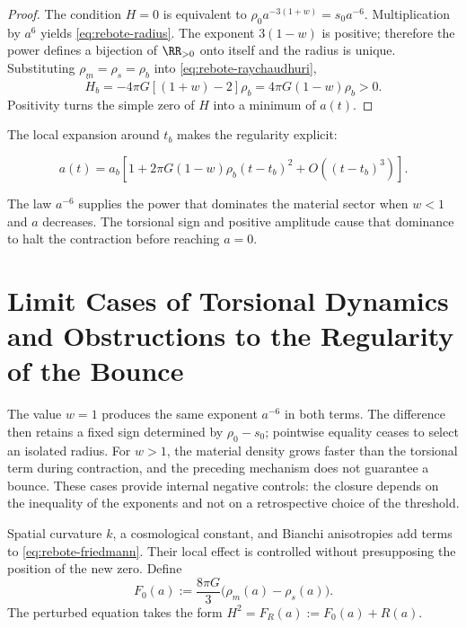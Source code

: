 \begin{proof}
The condition \(H=0\) is equivalent to
\(\rho_0a^{-3(1+w)}=s_0a^{-6}\).  Multiplication by \(a^6\) yields
\cref{eq:rebote-radius}.  The exponent \(3(1-w)\) is positive; therefore the
power defines a bijection of \(\RR_{>0}\) onto itself and the radius is
unique.  Substituting \(\rho_m=\rho_s=\rho_b\) into
\cref{eq:rebote-raychaudhuri},
\[
 \dot H_b=-4\pi G[(1+w)-2]\rho_b
 =4\pi G(1-w)\rho_b>0.
\]
Positivity turns the simple zero of \(H\) into a minimum of \(a(t)\).
\end{proof}

The local expansion around \(t_b\) makes the regularity explicit:

\begin{equation}
 a(t)=a_b\left[
 1+2\pi G(1-w)\rho_b(t-t_b)^2
 +O\!\left((t-t_b)^3\right)
 \right].
 \label{eq:rebote-local-expansion}
\end{equation}

The law \(a^{-6}\) supplies the power that dominates the material sector when
\(w<1\) and \(a\) decreases. The torsional sign and positive amplitude cause
that dominance to halt the contraction before reaching \(a=0\).

\section{Limit Cases of Torsional Dynamics and Obstructions to the Regularity of the Bounce}

The value \(w=1\) produces the same exponent \(a^{-6}\) in both terms. The difference then retains a fixed sign determined by \(\rho_0-s_0\); pointwise equality ceases to select an isolated radius. For \(w>1\), the material density grows faster than the torsional term during contraction, and the preceding mechanism does not guarantee a bounce. These cases provide internal negative controls: the closure depends on the inequality of the exponents and not on a retrospective choice of the threshold.

Spatial curvature \(k\), a cosmological constant, and Bianchi anisotropies
add terms to \cref{eq:rebote-friedmann}. Their local effect
is controlled without presupposing the position of the new zero. Define
\[
 F_0(a):=\frac{8\pi G}{3}\bigl(\rho_m(a)-\rho_s(a)\bigr).
\]
The perturbed equation takes the form
\(H^2=F_R(a):=F_0(a)+R(a)\).

